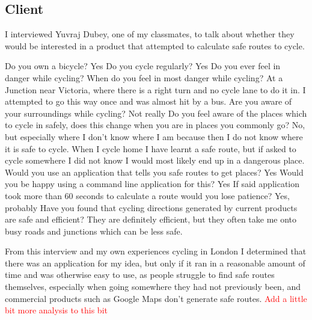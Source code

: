 \documentclass[11pt,twoside,a4paper]{article}
\begin{document}
\subsection{Client}
I interviewed Yuvraj Dubey, one of my classmates, to talk about whether they would be interested in a product that attempted to calculate safe routes to cycle. 
\begin{dialogue}
    Do you own a bicycle?
     Yes
     Do you cycle regularly?
     Yes
    Do you ever feel in danger while cycling?
    When do you feel in most danger while cycling?
    At a Junction near Victoria, where there is a right turn and no cycle lane to do it in. I attempted to go this way once and was almost hit by a bus.
    Are you aware of your surroundings while cycling?
    Not really
     Do you feel aware of the places which to cycle in safely, does this change when you are in places you commonly go?
    No, but especially where I don't know where I am because then I do not know where it is safe to cycle. When I cycle home I have learnt a safe route, but if asked to cycle somewhere I did not know I would most likely end up in a dangerous place.
    Would you use an application that tells you safe routes to get places?
    Yes
    Would you be happy using a command line application for this?
    Yes
    If said application took more than 60 seconds to calculate a route would you lose patience?
    Yes, probably
    Have you found that cycling directions generated by current products are safe and efficient?
    They are definitely efficient, but they often take me onto busy roads and junctions which can be less safe.
\end{dialogue}
From this interview and my own experiences cycling in London I determined that there was an application for my idea, but only if it ran in a reasonable amount of time and was otherwise easy to use, as people struggle to find safe routes themselves, especially when going somewhere they had not previously been, and commercial
products such as Google Maps don't generate safe routes. 
\textcolor{red}{Add a little bit more analysis to this bit}
\newpage
\end{document}
